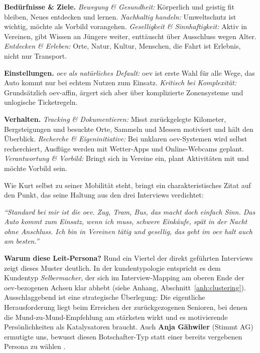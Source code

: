 \textbf{Bedürfnisse \& Ziele.} \emph{Bewegung \& Gesundheit:} Körperlich und geistig fit bleiben, Neues entdecken und lernen.
\emph{Nachhaltig handeln:} Umweltschutz ist wichtig, möchte als Vorbild vorangehen.
\emph{Geselligkeit \& Sinnhaftigkeit:} Aktiv in Vereinen, gibt Wissen an Jüngere weiter, enttäuscht über Ausschluss wegen Alter.
\emph{Entdecken \& Erleben:} Orte, Natur, Kultur, Menschen, die Fahrt ist Erlebnis, nicht nur Transport.

\textbf{Einstellungen.} \emph{\gls{oev} als natürliches Default:} \gls{oev} ist erste Wahl für alle Wege, das Auto kommt nur bei echtem Nutzen zum Einsatz.
\emph{Kritisch bei Komplexität:} Grundsätzlich \gls{oev}-affin, ärgert sich aber über komplizierte Zonensysteme und unlogische Ticketregeln.

\textbf{Verhalten.} \emph{Tracking \& Dokumentieren:} Misst zurückgelegte Kilometer, Bergsteigungen und besuchte Orte, Sammeln und Messen motiviert und hält den Überblick.
\emph{Recherche \& Eigeninitiative:} Bei unklaren \gls{oev}-Systemen wird selbst recherchiert, Ausflüge werden mit Wetter-Apps und Online-Webcams geplant.
\emph{Verantwortung \& Vorbild:} Bringt sich in Vereine ein, plant Aktivitäten mit und möchte Vorbild sein.

Wie Kurt selbst zu seiner Mobilität steht, bringt ein charakteristisches Zitat auf den Punkt, das seine Haltung aus den drei Interviews verdichtet:

\textit{``Standard bei mir ist die \gls{oev}.
Zug, Tram, Bus, das macht doch einfach Sinn.
Das Auto kommt zum Einsatz, wenn ich muss, schwere Einkäufe, spät in der Nacht ohne Anschluss.
Ich bin in Vereinen tätig und gesellig, das geht im \gls{oev} halt auch am besten.''}



\textbf{Warum diese Leit-Persona?} Rund ein Viertel der direkt geführten Interviews zeigt dieses Muster deutlich. 
In der \gls{kundentypologie} entspricht es dem Kundentyp \emph{Selbermacher}, der sich im Interview-Mapping am oberen Ende der \gls{oev}-bezogenen Achsen klar abhebt (siehe Anhang, Abschnitt~\ref{anh:clustering}).
Ausschlaggebend ist eine strategische Überlegung: Die eigentliche Herausforderung liegt beim Erreichen der zurückgezogenen Senioren, bei denen die Mund-zu-Mund-Empfehlung am stärksten wirkt und es motivierende Persönlichkeiten als Katalysatoren braucht.
Auch \textbf{Anja Gähwiler} (Stimmt AG) ermutigte uns, bewusst diesen Botschafter-Typ statt einer bereits vergebenen Persona zu wählen \parencite{gaehwiler2026}.

